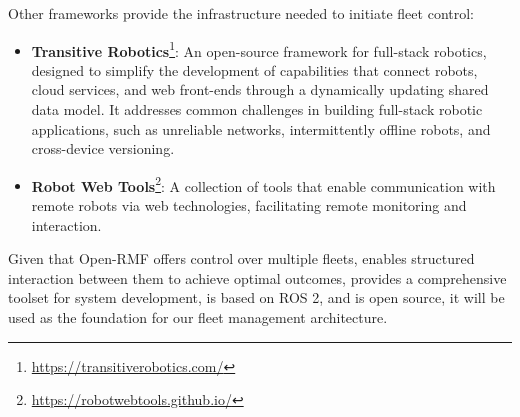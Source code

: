 Other frameworks provide the infrastructure needed to initiate fleet control:
\begin{itemize}
	\item \textbf{Transitive Robotics}\footnote{\href{https://transitiverobotics.com/}{https://transitiverobotics.com/}}: An open-source framework for full-stack robotics, designed to simplify the development of capabilities that connect robots, cloud services, and web front-ends through a dynamically updating shared data model. It addresses common challenges in building full-stack robotic applications, such as unreliable networks, intermittently offline robots, and cross-device versioning.
	\item \textbf{Robot Web Tools}\footnote{\href{https://robotwebtools.github.io/}{https://robotwebtools.github.io/}}: A collection of tools that enable communication with remote robots via web technologies, facilitating remote monitoring and interaction.
\end{itemize}
Given that Open-RMF offers control over multiple fleets, enables structured interaction between them to achieve optimal outcomes, provides a comprehensive toolset for system development, is based on ROS 2, and is open source, it will be used as the foundation for our fleet management architecture.
